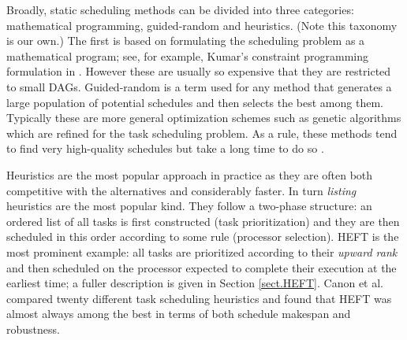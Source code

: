 \documentclass[runningheads]{llncs}
\begin{document}
Broadly, static scheduling methods can be divided into three categories: mathematical programming, guided-random and heuristics. (Note this taxonomy is our own.) The first is based on formulating the scheduling problem as a mathematical program; see, for example, Kumar's constraint programming formulation in \cite{kumar:tel-01538516}. However these are usually so expensive that they are restricted to small DAGs. Guided-random is a term used for any method that generates a large population of potential schedules and then selects the best among them. Typically these are more general optimization schemes such as genetic algorithms which are refined for the task scheduling problem. As a rule, these methods tend to find very high-quality schedules but take a long time to do so \cite{BRAUN2001810}. 

Heuristics are the most popular approach in practice as they are often both competitive with the alternatives and considerably faster. In turn {\em listing} heuristics are the most popular kind. They follow a two-phase structure: an ordered list of all tasks is first constructed (task prioritization) and they are then scheduled in this order according to some rule (processor selection). HEFT is the most prominent example: all tasks are prioritized according to their {\em upward rank} and then scheduled on the processor expected to complete their execution at the earliest time; a fuller description is given in Section \ref{sect.HEFT}. Canon et al. \cite{canon2008comparative} compared twenty different task scheduling heuristics and found that HEFT was almost always among the best in terms of both schedule makespan and robustness.

\end{document}
